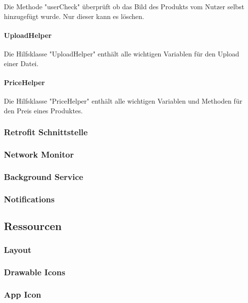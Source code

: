 \documentclass{scrartcl}
\begin{document}
\noindent Die Methode "userCheck" überprüft ob das Bild des Produkts vom Nutzer selbst hinzugefügt wurde. Nur dieser kann es löschen. \newline 

\paragraph{UploadHelper}
Die Hilfsklasse "UploadHelper" enthält alle wichtigen Variablen für den Upload einer Datei. \newline 

\paragraph{PriceHelper}
Die Hilfsklasse "PriceHelper" enthält alle wichtigen Variablen und Methoden für den Preis eines Produktes. \newline

\subsubsection{Retrofit Schnittstelle}

\subsubsection{Network Monitor}

\subsubsection{Background Service}

\subsubsection{Notifications}

\subsection{Ressourcen}

\subsubsection{Layout}

\subsubsection{Drawable Icons}

\subsubsection{App Icon}
\end{document}
